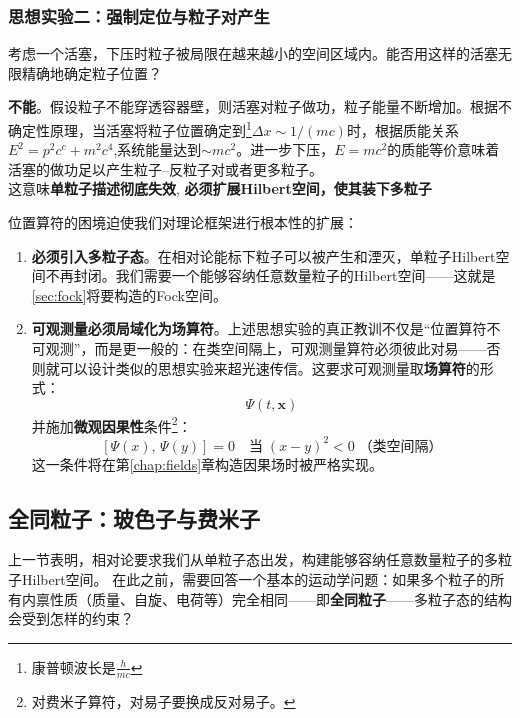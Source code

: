 \subsubsection*{思想实验二：强制定位与粒子对产生}
\begin{tcolorbox}[colback=white, colframe=black!40]
考虑一个活塞，下压时粒子被局限在越来越小的空间区域内。能否用这样的活塞无限精确地确定粒子位置？

\textbf{不能}。假设粒子不能穿透容器壁，则活塞对粒子做功，粒子能量不断增加。根据不确定性原理，当活塞将粒子位置确定到\footnote{康普顿波长是$\frac{h}{mc}$}$\Delta x \sim 1/(mc)$时，根据质能关系$E^2=p^2c^c+m^2c^4$,系统能量达到$\sim mc^2$。进一步下压，$E = mc^2$的质能等价意味着活塞的做功足以产生粒子--反粒子对或者更多粒子。
\medskip
\\
这意味\textbf{单粒子描述彻底失效},
\textbf{必须扩展Hilbert空间，使其装下多粒子}
\end{tcolorbox}
位置算符的困境迫使我们对理论框架进行根本性的扩展：
\begin{enumerate}
    \item \textbf{必须引入多粒子态}。在相对论能标下粒子可以被产生和湮灭，单粒子Hilbert空间不再封闭。我们需要一个能够容纳任意数量粒子的Hilbert空间——这就是\ref{sec:fock}将要构造的Fock空间。

    \item \textbf{可观测量必须局域化为场算符}。上述思想实验的真正教训不仅是``位置算符不可观测''，而是更一般的：在类空间隔上，可观测量算符必须彼此对易——否则就可以设计类似的思想实验来超光速传信。这要求可观测量取\textbf{场算符}的形式：
    \begin{equation}
        \Psi(t,\boldsymbol{x})
    \end{equation}
    并施加\textbf{微观因果性}条件\footnote{对费米子算符，对易子要换成反对易子。}：
    \begin{equation}\label{eq:microcausality-preview}
        [\Psi(x),\, \Psi(y)] = 0 \quad \text{当}\;(x-y)^2 < 0\;\text{（类空间隔）}
    \end{equation}
    这一条件将在第\ref{chap:fields}章构造因果场时被严格实现。
\end{enumerate}
\subsection{全同粒子：玻色子与费米子}\label{sec:identical}

上一节表明，相对论要求我们从单粒子态出发，构建能够容纳任意数量粒子的多粒子Hilbert空间。
在此之前，需要回答一个基本的运动学问题：如果多个粒子的所有内禀性质（质量、自旋、电荷等）完全相同——即\textbf{全同粒子}——多粒子态的结构会受到怎样的约束？

